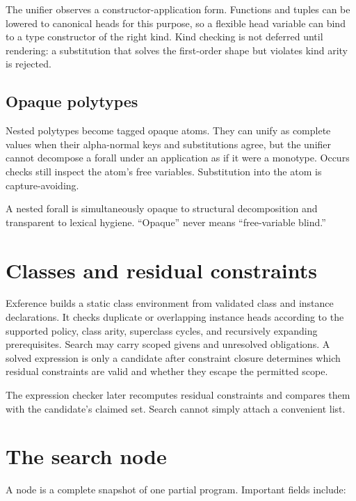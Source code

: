 \documentclass[10pt,letterpaper,oneside]{report}
\begin{document}
The unifier observes a constructor-application form. Functions and tuples can be lowered to canonical heads for this purpose, so a flexible head variable can bind to a type constructor of the right kind. Kind checking is not deferred until rendering: a substitution that solves the first-order shape but violates kind arity is rejected.

\subsection{Opaque polytypes}

Nested polytypes become tagged opaque atoms. They can unify as complete values when their alpha-normal keys and substitutions agree, but the unifier cannot decompose a forall under an application as if it were a monotype. Occurs checks still inspect the atom's free variables. Substitution into the atom is capture-avoiding.

\begin{invariantbox}
A nested forall is simultaneously opaque to structural decomposition and transparent to lexical hygiene. ``Opaque'' never means ``free-variable blind.''
\end{invariantbox}

\section{Classes and residual constraints}

Exference builds a static class environment from validated class and instance declarations. It checks duplicate or overlapping instance heads according to the supported policy, class arity, superclass cycles, and recursively expanding prerequisites. Search may carry scoped givens and unresolved obligations. A solved expression is only a candidate after constraint closure determines which residual constraints are valid and whether they escape the permitted scope.

The expression checker later recomputes residual constraints and compares them with the candidate's claimed set. Search cannot simply attach a convenient list.

\section{The search node}\label{sec:exference-node}

A node is a complete snapshot of one partial program. Important fields include:
\end{document}
